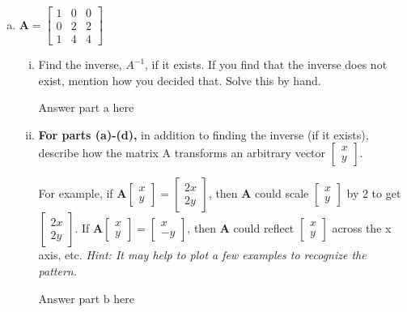 \documentclass[11pt]{article}
\def\A{\textbf{A}} %
\begin{document}
\begin{enumerate}
\begin{enumerate}[(a)]
	      	\newpage
	      	\item $\A = \begin{bmatrix}
	      	      1 & 0 & 0 \\
	      	      0 & 2 & 2 \\
	      	      1 & 4 & 4
	      	\end{bmatrix}$
	      	\begin{enumerate}[i.]
	      		\item Find the inverse, $A^{-1}$, if it exists. If you find that the inverse does not exist, mention how you decided that. Solve this by hand.
	      		      \begin{Answer}
	      		      	Answer part a here
	      		      \end{Answer}
	      		\item \textbf{For parts (a)-(d),} in addition to finding the inverse (if it exists), describe how the matrix A transforms an arbitrary vector $\begin{bmatrix}
	      		      x \\
	      		      y
	      		\end{bmatrix}$.
	      			      		                    
	      		For example, if $\A \begin{bmatrix}
	      		x \\
	      		y
	      		\end{bmatrix} = \begin{bmatrix}
	      		2x \\
	      		2y
	      		\end{bmatrix}$, then $\A$ could scale $\begin{bmatrix}
	      		x \\
	      		y
	      		\end{bmatrix}$ by 2 to get $\begin{bmatrix}
	      		2x \\
	      		2y
	      		\end{bmatrix}$. If $\A \begin{bmatrix}
	      		x \\
	      		y
	      		\end{bmatrix}
	      		=
	      		\begin{bmatrix}
	      			x  \\
	      			-y 
	      		\end{bmatrix}$, then $\A$ could reflect $\begin{bmatrix}
	      		x \\
	      		y
	      		\end{bmatrix}$ across the x axis, etc. \textit{Hint: It may help to plot a few examples to recognize the pattern.}
	      		\begin{Answer}
	      			Answer part b here
	      		\end{Answer}
	      	\end{enumerate}
	      \end{enumerate}
	      	      

\end{enumerate}
\end{document}
